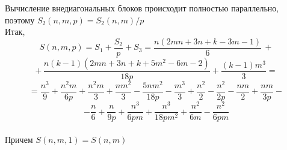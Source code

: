 \documentclass[a4paper,12pt]{article}
\begin{document}
    Вычисление внедиагональных блоков происходит полностью параллельно, поэтому 
    $ S_2(n,m,p) = S_2(n,m)/p $ \\

    Итак, 
    $$
        S(n,m,p) = S_1 + \frac{S_2}{p} + S_3 = 
        \frac{n(2mn + 3n + k - 3m -1)}6 \,+ $$$$ +\,
        \frac{n(k-1)(2mn+3n+k+5m^2-6m-2)}{18p} +
        \frac{(k-1)m^3}3 = $$$$ =
        \frac{n^3}9 + \frac{n^2m}{6p} + \frac{n^2m}{3} +
        \frac{nm^2}3 - \frac{5nm^2}{18p} - \frac{m^3}3 +
        \frac{n^2}2 - \frac{n^2}{2p} - \frac{nm}2 + \frac{nm}{3p} - $$$$ -
        \frac{n}6 + \frac{n}{9p} + \frac{n^3}{6pm} + \frac{n^3}{18pm^2} +
        \frac{n^2}{6m} - \frac{n^2}{6pm}
    $$ \\
    
    Причем $S(n,m,1) = S(n,m)$
\end{document}
